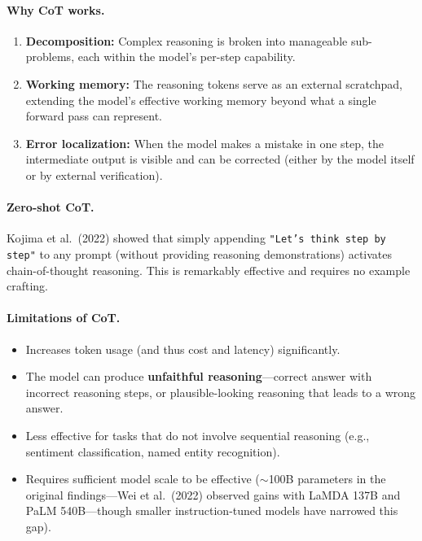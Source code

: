 \paragraph{Why CoT works.}
\begin{enumerate}[leftmargin=*]
\item \textbf{Decomposition:} Complex reasoning is broken into manageable
  sub-problems, each within the model's per-step capability.
\item \textbf{Working memory:} The reasoning tokens serve as an external
  scratchpad, extending the model's effective working memory beyond what a
  single forward pass can represent.
\item \textbf{Error localization:} When the model makes a mistake in one step,
  the intermediate output is visible and can be corrected (either by the model
  itself or by external verification).
\end{enumerate}

\paragraph{Zero-shot CoT.}
Kojima et al.\ (2022) showed that simply appending \texttt{"Let's think step
by step"} to any prompt (without providing reasoning demonstrations) activates
chain-of-thought reasoning.  This is remarkably effective and requires no
example crafting.

\paragraph{Limitations of CoT.}
\begin{itemize}[leftmargin=*]
\item Increases token usage (and thus cost and latency) significantly.
\item The model can produce \textbf{unfaithful reasoning}---correct answer
  with incorrect reasoning steps, or plausible-looking reasoning that leads
  to a wrong answer.
\item Less effective for tasks that do not involve sequential reasoning
  (e.g., sentiment classification, named entity recognition).
\item Requires sufficient model scale to be effective ($\sim$100B parameters
  in the original findings---Wei et al.\ (2022) observed gains with LaMDA 137B
  and PaLM 540B---though smaller instruction-tuned models have narrowed
  this gap).
\end{itemize}

